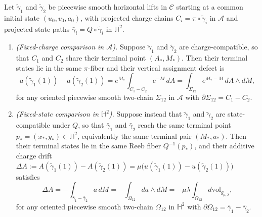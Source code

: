 \begin{theorem}
\label{thm:legendre-dual-tearing}
Let $\tilde{\gamma}_1$ and $\tilde{\gamma}_2$ be piecewise smooth horizontal lifts
in $\mathcal{C}$ starting at a common initial state $(u_0,v_0,a_0)$, with projected
charge chains $C_i=\pi\circ\tilde{\gamma}_i$ in $\mathcal{A}$ and projected state
paths $\bar{\gamma}_i=Q\circ\tilde{\gamma}_i$ in $\mathbb{H}^2$.
\begin{enumerate}
  \item \emph{(Fixed-charge comparison in $\mathcal{A}$).} Suppose $\tilde{\gamma}_1$
  and $\tilde{\gamma}_2$ are charge-compatible, so that $C_1$ and $C_2$ share their
  terminal point $(A_*,M_*)$. Then their terminal states lie in the same $\pi$-fiber
  and their vertical assignment defect is
  \begin{equation}\label{eq:dual-value-tearing}
    a(\tilde{\gamma}_1(1)) - a(\tilde{\gamma}_2(1))
    = e^{M_*}\int_{C_1 - C_2} e^{-M}\,dA
    = \int_{\Sigma_{12}} e^{M_* - M}\,dA\wedge dM,
  \end{equation}
  for any oriented piecewise smooth two-chain $\Sigma_{12}$ in $\mathcal{A}$ with
  $\partial\Sigma_{12}=C_1-C_2$.

  \item \emph{(Fixed-state comparison in $\mathbb{H}^2$).} Suppose instead that
  $\tilde{\gamma}_1$ and $\tilde{\gamma}_2$ are state-compatible under $Q$, so that
  $\bar{\gamma}_1$ and $\bar{\gamma}_2$ reach the same terminal point
  $p_*=(x_*,y_*)\in\mathbb{H}^2$, equivalently the same terminal pair $(M_*,a_*)$.
  Then their terminal states lie in the same Reeb fiber $Q^{-1}(p_*)$, and their
  additive charge drift $\Delta A := A(\tilde{\gamma}_1(1)) - A(\tilde{\gamma}_2(1))
  = \mu\big(u(\tilde{\gamma}_1(1)) - u(\tilde{\gamma}_2(1))\big)$ satisfies
  \begin{equation}\label{eq:dual-reeb-drift}
    \Delta A
    = -\int_{\bar{\gamma}_1 - \bar{\gamma}_2} a\,dM
    = -\int_{\Omega_{12}} da\wedge dM
    = -\mu\lambda \int_{\Omega_{12}} d\mathrm{vol}_{g_{\mu,\lambda}},
  \end{equation}
  for any oriented piecewise smooth two-chain $\Omega_{12}$ in $\mathbb{H}^2$ with
  $\partial\Omega_{12}=\bar{\gamma}_1-\bar{\gamma}_2$.
\end{enumerate}
\end{theorem}

